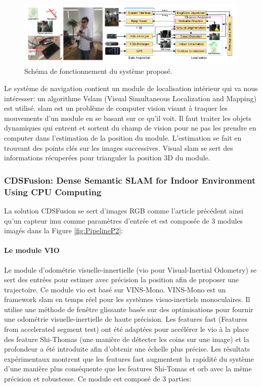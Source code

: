 \documentclass[11pt]{article}
\begin{document}
  \begin{figure}[hbt]  
    \includegraphics[width=\textwidth]{PipelineP1.png}    
    \caption{Schéma de fonctionnement du système proposé.}
    \label{fig:PipelineP1}
  \end{figure} 

  Le système de navigation contient un module de localisation intérieur qui va nous intéresser: un algorithme V\acrshort{slam} (Visual Simultaneous 
  Localization and Mapping) est utilisé. \acrshort{slam} est un problème de computer vision visant à traquer les mouvements d'un module en se basant
  sur ce qu'il voit. Il faut traiter les objets dynamiques qui entrent et sortent du champ de vision pour ne pas les prendre en computer
  dans l'estimation de la position du module. L'estimation se fait en trouvant des points clés sur les images successives.  Visual \acrshort{slam}
  se sert des informations récuperées pour trianguler la position 3D du module. 
  
  \pagebreak

  \subsubsection{CDSFusion: Dense Semantic SLAM for Indoor Environment Using CPU Computing}

  La solution CDSFusion \cite{wangCDSFusionDenseSemantic2022} se sert d'images RGB comme l'article précédent ainsi qu'un capteur \acrshort{imu} comme paramètres d'entrée et est composée de 
  3 modules imagés dans la Figure \ref{fig:PipelineP2}:

  \paragraph{Le module VIO}
  Le module d'odométrie visuelle-innertielle (\acrshort{vio} pour Visual-Inertial Odometry) se sert des entrées pour estimer avec précision la position 
  afin de proposer une trajectoire. Ce module \acrshort{vio} est basé sur VINS-Mono. VINS-Mono est un framework \acrshort{slam} en temps réel pour les 
  systèmes visuo-inertiels monoculaires. Il utilise une méthode de fenêtre glissante basée sur des optimisations pour fournir une odométrie 
  visuelle-inertielle de haute précision.
  Les features \acrshort{fast} (Features from accelerated segment test) ont été adaptées pour accélérer le \acrshort{vio} à 
  la place des feature Shi-Thomas (une manière de détecter les coins sur une image) et la profondeur a été introduite afin d'obtenir une échelle 
  plus précise. Les résultats expérimentaux montrent que les features \acrshort{fast} augmentent la rapidité du système d'une manière plus conséquente 
  que les features Shi-Tomas et \acrshort{orb} avec la même précision et robustesse. Ce module est composé de 3 parties:
\end{document}
